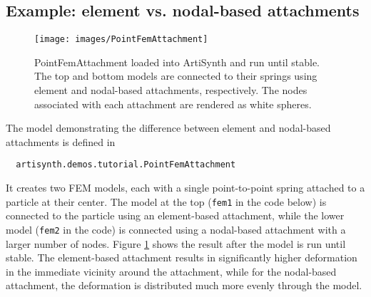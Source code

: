 \subsection{Example: element vs. nodal-based attachments}

\begin{figure}[ht]
\centering
{}
\texttt{[image: images/PointFemAttachment]}
\caption{PointFemAttachment loaded into ArtiSynth and run until stable.
The top and bottom models are connected to their springs using element
and nodal-based attachments, respectively.  The nodes associated with
each attachment are rendered as white spheres.}
\label{fig:fem:pointFemAttachment}
\end{figure}

The model demonstrating the difference between element and
nodal-based attachments is defined in
%
\begin{verbatim}
  artisynth.demos.tutorial.PointFemAttachment
\end{verbatim}
%
It creates two FEM models, each
with a single point-to-point spring attached to a particle at their
center. The model at the top ({\tt fem1} in the code below) is
connected to the particle using an element-based attachment, while the
lower model ({\tt fem2} in the code) is connected using a nodal-based
attachment with a larger number of nodes. Figure
\ref{fig:fem:pointFemAttachment} shows the result after the model is
run until stable. The element-based attachment results in
significantly higher deformation in the immediate vicinity around the
attachment, while for the nodal-based attachment, the deformation is
distributed much more evenly through the model.


